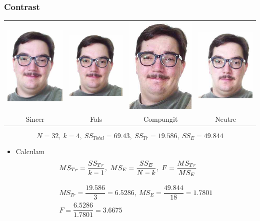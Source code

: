 \documentclass[12pt,t]{beamer}
\theoremstyle{plain}
\theoremstyle{definition}
\begin{document}
\begin{frame}
\frametitle{Contrast}

\begin{center}
\hspace*{-0.5cm}\begin{tabular}{cccc}
\includegraphics[width=0.14\linewidth]{felt} & 
\includegraphics[width=0.15\linewidth]{false} & 
\includegraphics[width=0.125\linewidth]{miserable} & 
\includegraphics[width=0.15\linewidth]{neutral}\\
Sincer & Fals & Compungit & Neutre
\end{tabular}
\end{center}
$$
N=32,\ k=4,\ SS_{Total}=69.43,\ SS_{Tr}=19.586,\ SS_E=49.844
$$

\begin{itemize}
\item Calculam 
$$
\hspace*{-5ex} MS_{Tr}=\frac{SS_{Tr}}{k-1},\
MS_E=\frac{SS_E}{N-k},\ F=\frac{MS_{Tr}}{MS_E}
$$\pause

$$
\begin{array}{c}
MS_{Tr}=\dfrac{19.586}{3}=6.5286,\ 
MS_E=\dfrac{49.844}{18}=1.7801\\
F=\dfrac{6.5286}{1.7801}=3.6675
\end{array}
$$
\end{itemize}
\end{frame}
\end{document}
